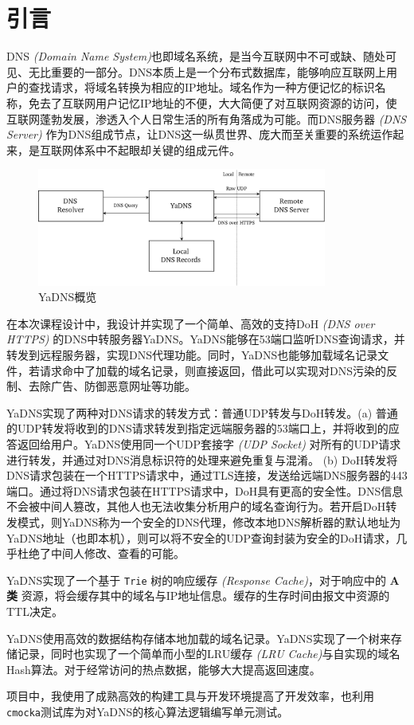 \part{引言}

DNS \emph{(Domain Name System)}也即域名系统，是当今互联网中不可或缺、随处可见、无比重要的一部分。DNS本质上是一个分布式数据库，能够响应互联网上用户的查找请求，将域名转换为相应的IP地址。域名作为一种方便记忆的标识名称，免去了互联网用户记忆IP地址的不便，大大简便了对互联网资源的访问，使互联网蓬勃发展，渗透入个人日常生活的所有角落成为可能。而DNS服务器 \emph{(DNS Server)} 作为DNS组成节点，让DNS这一纵贯世界、庞大而至关重要的系统运作起来，是互联网体系中不起眼却关键的组成元件。

\begin{figure}[h]
  \centering
  \includegraphics[width=0.85\textwidth]{figures/overview}
  \caption{YaDNS概览}
  \label{fig:overview}
\end{figure}

在本次课程设计中，我设计并实现了一个简单、高效的支持DoH \emph{(DNS over HTTPS)} 的DNS中转服务器YaDNS。YaDNS能够在53端口监听DNS查询请求，并转发到远程服务器，实现DNS代理功能。同时，YaDNS也能够加载域名记录文件，若请求命中了加载的域名记录，则直接返回，借此可以实现对DNS污染的反制、去除广告、防御恶意网址等功能。

YaDNS实现了两种对DNS请求的转发方式：普通UDP转发与DoH转发。(a) 普通的UDP转发将收到的DNS请求转发到指定远端服务器的53端口上，并将收到的应答返回给用户。YaDNS使用同一个UDP套接字 \emph{(UDP Socket)} 对所有的UDP请求进行转发，并通过对DNS消息标识符的处理来避免重复与混淆。 (b) DoH转发将DNS请求包装在一个HTTPS请求中，通过TLS连接，发送给远端DNS服务器的443端口。通过将DNS请求包装在HTTPS请求中，DoH具有更高的安全性。DNS信息不会被中间人篡改，其他人也无法收集分析用户的域名查询行为。若开启DoH转发模式，则YaDNS称为一个安全的DNS代理，修改本地DNS解析器的默认地址为YaDNS地址（也即本机），则可以将不安全的UDP查询封装为安全的DoH请求，几乎杜绝了中间人修改、查看的可能。

YaDNS实现了一个基于 \lstinline{Trie} 树的响应缓存 \emph{(Response Cache)}，对于响应中的 \textbf{A类} 资源，将会缓存其中的域名与IP地址信息。缓存的生存时间由报文中资源的TTL决定。

YaDNS使用高效的数据结构存储本地加载的域名记录。YaDNS实现了一个树来存储记录，同时也实现了一个简单而小型的LRU缓存 \emph{(LRU Cache)}与自实现的域名Hash算法。对于经常访问的热点数据，能够大大提高返回速度。

项目中，我使用了成熟高效的构建工具与开发环境提高了开发效率，也利用\texttt{cmocka}测试库为对YaDNS的核心算法逻辑编写单元测试。